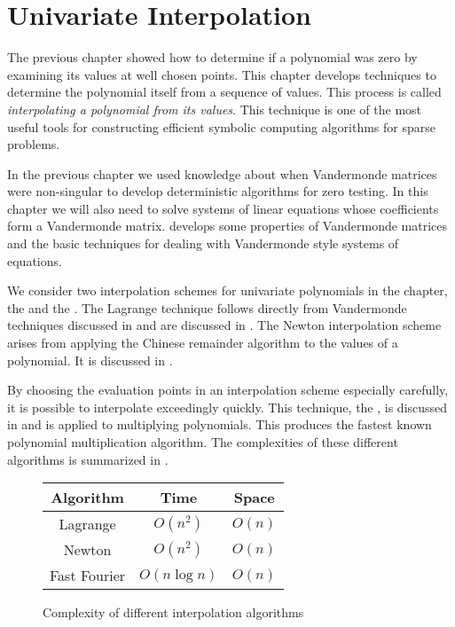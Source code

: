 \chapter{Univariate Interpolation}
\label{Interpolation:Chap}

The previous chapter showed how to determine if a polynomial was zero
by examining its values at well chosen points.  This chapter develops
techniques to determine the polynomial itself from a sequence of 
values.  This process is called {\em interpolating a polynomial
from its values\/}.  This technique is one of the most useful tools
for constructing efficient symbolic computing algorithms for sparse problems.

In the previous chapter we used knowledge about when Vandermonde matrices
were non-singular to develop deterministic algorithms for zero
testing.  In this chapter we will also need to solve systems of
linear equations whose coefficients form a Vandermonde matrix.
 develops some properties of Vandermonde
matrices and the basic techniques for dealing with Vandermonde style
systems of equations.

We consider two interpolation schemes for univariate polynomials in
the chapter, the  and the
.  The Lagrange technique follows
directly from Vandermonde techniques discussed in
 and are discussed in
.  The Newton interpolation scheme arises 
from applying the Chinese remainder algorithm to the values of a polynomial.  It is discussed in
.

By choosing the evaluation points in an interpolation scheme
especially carefully, it is possible to interpolate exceedingly
quickly.  This technique, the , is
discussed in  and is applied to multiplying
polynomials.  This produces the fastest known polynomial multiplication
algorithm.  The complexities of these different algorithms is
summarized in .

\begin{figure}
\begin{center}
\begin{tabular}{|c|c|c|}
\multicolumn{1}{c}{Algorithm} & \multicolumn{1}{c}{Time} 
  & \multicolumn{1}{c}{Space} \\ \hline
Lagrange & $O(n^2)$ & $O(n)$ \\ \hline
Newton & $O(n^2)$ & $O(n)$ \\ \hline
Fast Fourier  & $O(n \log n)$ & $O(n)$ \\ \hline
\end{tabular}
\end{center}
\caption{Complexity of different interpolation
algorithms\label{Interp:Complex:Fig}}
\end{figure}


